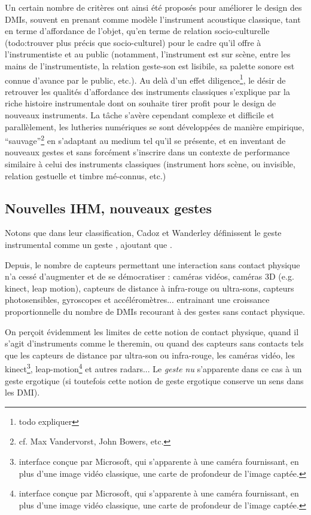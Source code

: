 Un certain nombre de critères ont ainsi été proposés pour améliorer le design des DMIs, souvent en prenant comme modèle l'instrument acoustique classique, tant en terme d'affordance de l'objet, qu'en terme de relation socio-culturelle (todo:trouver plus précis que socio-culturel) pour le cadre qu'il offre à l'instrumentiste et au public (notamment, l'instrument est sur scène, entre les mains de l'instrumentiste, la relation geste-son est lisibile, sa palette sonore est connue d'avance par le public, etc.).
Au delà d'un effet diligence\footnote{todo expliquer}, le désir de retrouver les qualités d'affordance des instruments classiques s'explique par la riche histoire instrumentale dont on souhaite tirer profit pour le design de nouveaux instruments. La tâche s'avère cependant complexe et difficile et parallèlement, les lutheries numériques se sont développées de manière empirique, ``sauvage''\footnote{cf. Max Vandervorst, John Bowers, etc.} en s'adaptant au medium tel qu'il se présente, et en inventant de nouveaux gestes et sans forcément s'inscrire dans un contexte de performance similaire à celui des instruments classiques (instrument hors scène, ou invisible, relation gestuelle et timbre mé-connus, etc.)

\subsection{Nouvelles IHM, nouveaux gestes}

Notons que dans leur classification, Cadoz et Wanderley \cite{todo} définissent le geste instrumental comme un geste , ajoutant que .

Depuis, le nombre de capteurs permettant une interaction sans contact physique n'a cessé d'augmenter et de se démocratiser : caméras vidéos, caméras 3D (e.g. kinect, leap motion), capteurs de distance à infra-rouge ou ultra-sons, capteurs photosensibles, gyroscopes et accéléromètres... entrainant une croissance proportionnelle du nombre de DMIs recourant à des gestes sans contact physique.

On perçoit évidemment les limites de cette notion de contact physique, quand il s'agit d'instruments comme le theremin, ou quand des capteurs sans contacts tels que les capteurs de distance par ultra-son ou infra-rouge, les caméras vidéo, les kinect\footnote{interface conçue par Microsoft, qui s'apparente à une caméra fournissant, en plus d'une image vidéo classique, une carte de profondeur de l'image captée.}, leap-motion\footnote{interface conçue par Microsoft, qui s'apparente à une caméra fournissant, en plus d'une image vidéo classique, une carte de profondeur de l'image captée.} et autres radars... Le \textit{geste nu} s'apparente dans ce cas à un geste ergotique (si toutefois cette notion de geste ergotique conserve un sens dans les DMI).

